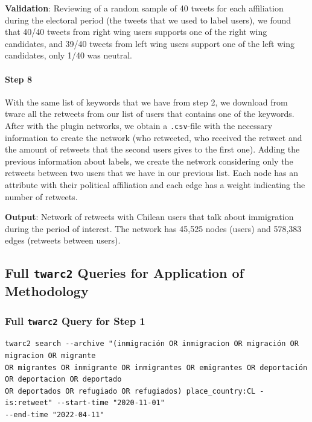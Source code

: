         \textbf{Validation}: Reviewing of a random sample of 40 tweets for each affiliation during the electoral period (the tweets that we used to label users), we found that 40/40 tweets from right wing users supports one of the right wing candidates, and 39/40 tweets from left wing users support one of the left wing candidates, only 1/40 was neutral.
        
        
        \paragraph{Step 8} 
        
        With the same list of keywords that we have from step 2, we download from twarc all the retweets from our list of users that contains one of the keywords. After with the plugin networks, we obtain a \texttt{.csv}-file with the necessary information to create the network (who retweeted, who received the retweet and the amount of retweets that the second users gives to the first one). Adding the previous information about labels, we create the network considering only the retweets between two users that we have in our previous list. Each node has an attribute with their political affiliation and each edge has a weight indicating the number of retweets. 
        
        \textbf{Output}: Network of retweets with Chilean users that talk about immigration during the period of interest. The network has 45,525 nodes (users) and 578,383 edges (retweets between users).

    
        
       
        
        
    \subsection{Full \texttt{twarc2} Queries for Application of Methodology}\label{appsec_twarc_queries}
    
    \subsubsection{Full \texttt{twarc2} Query for Step 1}\label{appsec_twarc_query1}
        \begin{verbatim}
twarc2 search --archive "(inmigración OR inmigracion OR migración OR migracion OR migrante 
OR migrantes OR inmigrante OR inmigrantes OR emigrantes OR deportación OR deportacion OR deportado 
OR deportados OR refugiado OR refugiados) place_country:CL -is:retweet" --start-time "2020-11-01" 
--end-time "2022-04-11"   
        \end{verbatim}
        
